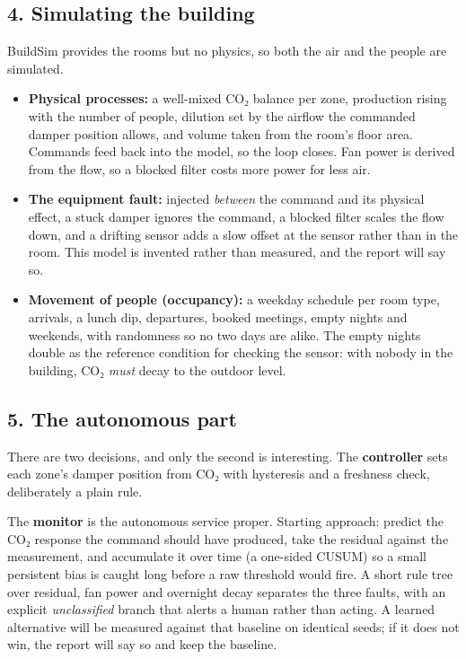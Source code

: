 \documentclass[
  11pt,
]{article}
\providecommand{\tightlist}{%
  \setlength{\itemsep}{0pt}\setlength{\parskip}{0pt}}
\begin{document}
\hypertarget{simulating-the-building}{%
\subsection{4. Simulating the building}\label{simulating-the-building}}

BuildSim provides the rooms but no physics, so both the air and the
people are simulated.

\begin{itemize}
\tightlist
\item
  \textbf{Physical processes:} a well-mixed CO₂ balance per zone,
  production rising with the number of people, dilution set by the
  airflow the commanded damper position allows, and volume taken from
  the room's floor area. Commands feed back into the model, so the loop
  closes. Fan power is derived from the flow, so a blocked filter costs
  more power for less air.
\item
  \textbf{The equipment fault:} injected \emph{between} the command and
  its physical effect, a stuck damper ignores the command, a blocked
  filter scales the flow down, and a drifting sensor adds a slow offset
  at the sensor rather than in the room. This model is invented rather
  than measured, and the report will say so.
\item
  \textbf{Movement of people (occupancy):} a weekday schedule per room
  type, arrivals, a lunch dip, departures, booked meetings, empty nights
  and weekends, with randomness so no two days are alike. The empty
  nights double as the reference condition for checking the sensor: with
  nobody in the building, CO₂ \emph{must} decay to the outdoor level.
\end{itemize}

\hypertarget{the-autonomous-part}{%
\subsection{5. The autonomous part}\label{the-autonomous-part}}

There are two decisions, and only the second is interesting. The
\textbf{controller} sets each zone's damper position from CO₂ with
hysteresis and a freshness check, deliberately a plain rule.

The \textbf{monitor} is the autonomous service proper. Starting
approach: predict the CO₂ response the command should have produced,
take the residual against the measurement, and accumulate it over time
(a one-sided CUSUM) so a small persistent bias is caught long before a
raw threshold would fire. A short rule tree over residual, fan power and
overnight decay separates the three faults, with an explicit
\emph{unclassified} branch that alerts a human rather than acting. A
learned alternative will be measured against that baseline on identical
seeds; if it does not win, the report will say so and keep the
baseline.
\end{document}
